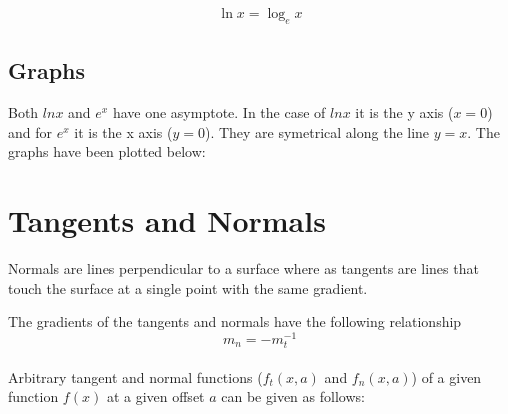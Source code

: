 \documentclass{article}
\begin{document}
\begin{gather}
	\ln{x} = \log_e{x}
\end{gather}

\subsection{Graphs}

Both $ln x$ and $e^x$ have one asymptote. In the case of $ln x$ it is the y axis ($x = 0$) and for $e^x$ it is the x axis ($y = 0$).
They are symetrical along the line $y=x$. The graphs have been plotted below:

\begin{center}
\end{center}

\section{Tangents and Normals}
Normals are lines perpendicular to a surface where as tangents are lines
that touch the surface at a single point with the same gradient.

\begin{center}
\end{center}
The gradients of the tangents and normals have the following relationship
\begin{equation}
	m_n = - m_t^{-1}
\end{equation}
\\
Arbitrary tangent and normal functions ($f_t(x, a)$ and $f_n(x, a)$) of a given function $f(x)$ at a given offset $a$ can be given as follows:
\end{document}
